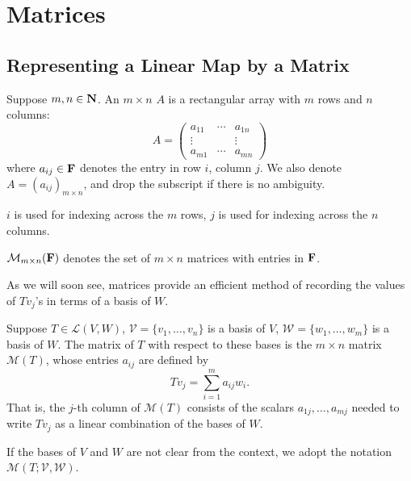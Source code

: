 \section{Matrices}
\subsection{Representing a Linear Map by a Matrix}
\begin{definition}[Matrix]
Suppose $m,n\in\mathbf N$. An $m\times n$  $A$ is a rectangular array with $m$ rows and $n$ columns:
\[A=\begin{pmatrix}
a_{11} & \cdots & a_{1n}\\
\vdots & & \vdots\\
a_{m1} & \cdots & a_{mn}
\end{pmatrix}\]
where $a_{ij}\in\mathbf F$ denotes the entry in row $i$, column $j$. We also denote $A=(a_{ij})_{m\times n}$, and drop the subscript if there is no ambiguity.
\end{definition}

\begin{notation}
$i$ is used for indexing across the $m$ rows, $j$ is used for indexing across the $n$ columns.
\end{notation}

\begin{notation}
$\mathcal{M}_{m\times n}(\mathbf F)$ denotes the set of $m\times n$ matrices with entries in $\mathbf F$.
\end{notation}

As we will soon see, matrices provide an efficient method of recording the values of $Tv_j$'s in terms of a basis of $W$.

\begin{definition}
Suppose $T\in\mathcal{L}(V,W)$, $\mathcal{V}=\{v_1,\dots,v_n\}$ is a basis of $V$, $\mathcal{W}=\{w_1,\dots,w_m\}$ is a basis of $W$. The matrix of $T$ with respect to these bases is the $m\times n$ matrix $\mathcal{M}(T)$, whose entries $a_{ij}$ are defined by
\[Tv_j=\sum_{i=1}^{m}a_{ij}w_i.\]
That is, the $j$-th column of $\mathcal{M}(T)$ consists of the scalars $a_{1j},\dots,a_{mj}$ needed to write $Tv_j$ as a linear combination of the bases of $W$.
\end{definition}

\begin{notation}
If the bases of $V$ and $W$ are not clear from the context, we adopt the notation $\mathcal{M}(T;\mathcal{V},\mathcal{W})$.
\end{notation}

